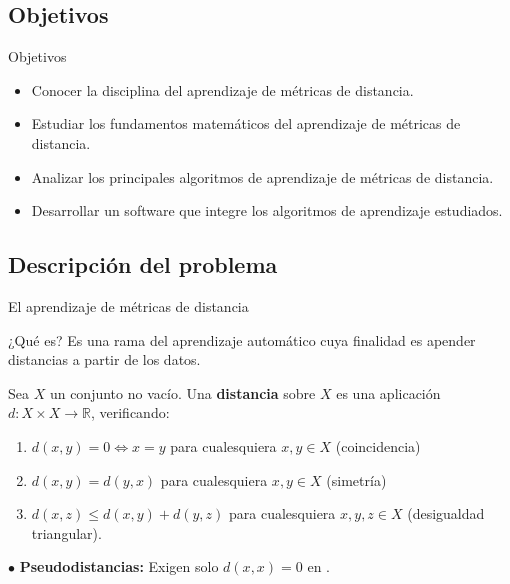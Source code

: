 \documentclass[10pt, compress]{beamer}
\newcommand\R{\mathbb{R}}
\newcommand\itemref[1]{{\renewcommand{\insertenumlabel}{\ref{#1}}%
  \usebeamertemplate{enumerate item}}}
\begin{document}
\subsection{Objetivos}

\begin{frame}{Objetivos}

\begin{itemize}

  \item Conocer la disciplina del aprendizaje de métricas de distancia.

  \item Estudiar los fundamentos matemáticos del aprendizaje de métricas de distancia.

  \item Analizar los principales algoritmos de aprendizaje de métricas de distancia.

  \item Desarrollar un software que integre los algoritmos de aprendizaje estudiados. 

\end{itemize}

\end{frame}


\subsection{Descripción del problema}

\begin{frame}{El aprendizaje de métricas de distancia}

\begin{block}{¿Qué es?}
  Es una rama del aprendizaje automático cuya finalidad es apender distancias a partir de los datos.

\end{block}

\begin{definition}
  Sea $X$ un conjunto no vacío. Una \textbf{distancia} sobre $X$ es una aplicación $d \colon X \times X \to \R$, verificando:
  \begin{enumerate}
    \item $d(x,y) = 0 \iff x = y$ para cualesquiera $x, y \in X$ (coincidencia) \label{item:dist:1}
    \item $d(x,y) = d(y,x)$ para cualesquiera $x, y \in X$ (simetría)
    \item $d(x,z) \le d(x,y) + d(y,z)$ para cualesquiera $x,y,z \in X$ (desigualdad triangular).
  \end{enumerate}
  $\bullet$ \textbf{Pseudodistancias: } Exigen solo $d(x,x) = 0$ en \itemref{item:dist:1}.
\end{definition}

\end{frame}
\end{document}
